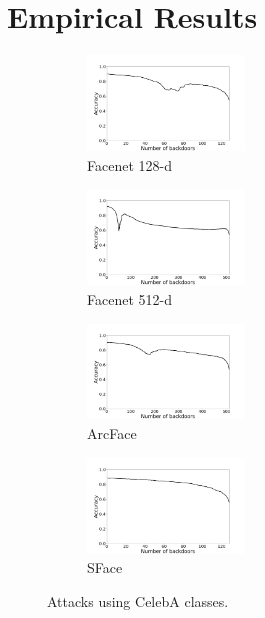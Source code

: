 \documentclass{article}
\theoremstyle{plain}
\theoremstyle{definition}
\theoremstyle{remark}
\begin{document}
\section{Empirical Results}
\label{Empirical Results}
    \begin{figure}[t!]
    \centering
    \begin{subfigure}[t]{0.23\textwidth}
        \centering
        \includegraphics[height=1.0in]{figures/celeba_attack_Facenet_opencv_cosine_128.png}
        \caption{Facenet 128-d}
    \end{subfigure}%
    \hfill 
    \begin{subfigure}[t]{0.23\textwidth}
        \centering
        \includegraphics[height=1.0in]{figures/celeba_attack_Facenet512_opencv_cosine_512.png}
        \caption{Facenet 512-d}
    \end{subfigure}
    \hfill 
    \begin{subfigure}[t]{0.23\textwidth}
        \centering
        \includegraphics[height=1.0in]{figures/celeba_attack_ArcFace_opencv_cosine_512.png}
        \caption{ArcFace}
    \end{subfigure}
    \hfill 
    \begin{subfigure}[t]{0.23\linewidth}
        \centering
        \includegraphics[height=1.0in]{figures/celeba_attack_SFace_opencv_cosine_128.png}
        \caption{SFace}
    \end{subfigure}
    \caption{Attacks using CelebA classes.}
\end{figure}
\end{document}

